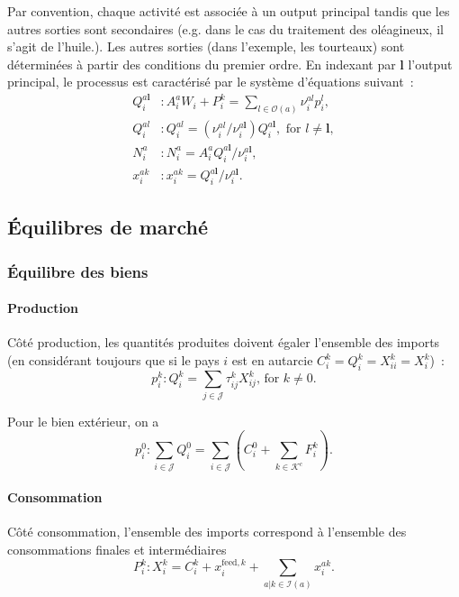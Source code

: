 Par convention, chaque activité est associée à un output principal tandis que les autres sorties sont secondaires (e.g. dans le cas du traitement des oléagineux, il s’agit de l’huile.). Les autres sorties (dans l’exemple, les tourteaux) sont déterminées à partir des conditions du premier ordre. En indexant par $\mathbf{l}$ l’output principal, le processus est caractérisé par le système d’équations suivant~:
\begin{align}
    Q_i^{a \mathbf{l}} & : A_i^a W_i + P_i^k = \sum_{l\in \mathcal{O}(a)} \nu_i^{al} p_i^{l},                                             \\
    Q_i^{al}           & : Q_i^{al} = \left( \nu_i^{al} / \nu_i^{a \mathbf{l}} \right)Q_i^{a \mathbf{l}}, \text{ for } l \neq \mathbf{l}, \\
    N_i^a              & : N_i^a = A_i^a Q_i^{a \mathbf{l}} / \nu_i^{a \mathbf{l}},                                                       \\
    x_i^{ak}           & :x_i^{ak} = Q_i^{a \mathbf{l}} / \nu_i^{a \mathbf{l}}.
\end{align}

\subsection{Équilibres de marché}
\subsubsection{Équilibre des biens}
\paragraph{Production} Côté production, les quantités produites doivent égaler l’ensemble des imports (en considérant toujours que si le pays $i$ est en autarcie $C_i^k = Q_i^k = X_{ii}^k = X_i^k$)~:
\begin{equation}
    p_i^k: Q_i^k = \sum_{j \in \mathcal{J}} \tau_{ij}^k X_{ij}^k \text{, for } k \neq 0.
\end{equation}

Pour le bien extérieur, on a
\begin{equation}
    p_i^0: \sum_{i \in \mathcal{J}} Q_i^0 = \sum_{i \in \mathcal{J}} \left( C_i^0 + \sum_{k \in \mathcal{K}^c} F_i^k \right).
\end{equation}

\paragraph{Consommation} Côté consommation, l’ensemble des imports correspond à l’ensemble des consommations finales et intermédiaires
\begin{equation}
    P_i^k: X_i^k=C_i^k + x_i^{\text{feed},k} + \sum_{a | k \in \mathcal{I}(a)} x_i^{ak}.
\end{equation}

